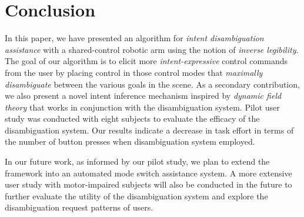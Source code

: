 \documentclass[natbib, twocolumn]{svjour3}          %
\begin{document}
\section{Conclusion}\label{sec:conclusions}
In this paper, we have presented an algorithm for \textit{intent disambiguation assistance} with a shared-control robotic arm using the notion of \textit{inverse legibility}. The goal of our algorithm is to elicit more \textit{intent-expressive} control commands from the user by placing control in those control modes that \textit{maximally disambiguate} between the various goals in the scene. As a secondary contribution, we also present a novel intent inference mechanism inspired by \textit{dynamic field theory} that works in conjunction with the disambiguation system. Pilot user study was conducted with eight subjects to evaluate the efficacy of the disambiguation system. Our results indicate a decrease in task effort in terms of the number of button presses when disambiguation system employed. 

In our future work, as informed by our pilot study, we plan to extend the framework into an automated mode switch assistance system. A more extensive user study with motor-impaired subjects will also be conducted in the future to further evaluate the utility of the disambiguation system and explore the disambiguation request patterns of users.  

\end{document}
